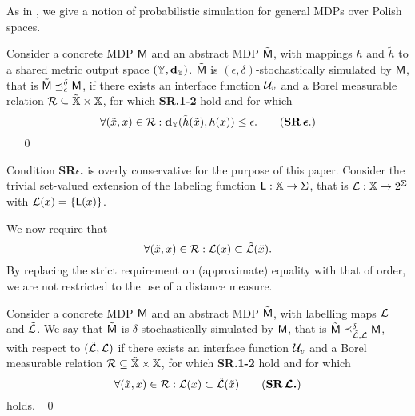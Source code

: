 \documentclass{ifacconf}
\begin{document}
As in \citep{haesaert2017verification},  we give a notion of probabilistic simulation for  general MDPs over Polish spaces.
%
\begin{definition}\label{def:apbsim}
Consider a concrete MDP $\mathsf{M}$ and an abstract  MDP $\tilde{\mathsf{M}}$, with mappings $h$ and  $\tilde h$  to a shared {metric} output space  $({\mathbb{Y}},\mathbf{d}_{\mathbb{Y}})$.   
	$\tilde{\mathsf{M}}$ is $(\epsilon,\delta)$-stochastically simulated by $\mathsf{M}$, that is $\tilde{\mathsf{M}}\preceq^{\delta}_\epsilon\mathsf{M}$,  if there exists an interface function $\mathcal{U}_{v}$ and
	a Borel measurable relation $\mathcal{R}\subseteq \tilde {{\mathbb{X}}}\times {\mathbb{X}}$, for which \textbf{SR.1-2} hold and for which 
	\begin{equation}
		\forall (\tilde x,x)\in \rel:\mathbf{d}_\Y(\tilde h(\tilde x),h(x))  \leq \epsilon.\tag{\textbf{SR\,$\boldsymbol{\epsilon}$}.}
	\end{equation} 
\mbox{ }	\hfill\mbox{ }\qed
\end{definition}
Condition \textbf{SR$\epsilon$.} is overly conservative for the purpose of this paper. 
Consider the trivial set-valued extension of  the labeling function $\mathsf{L}:{\mathbb{X}}\rightarrow\Sigma$, that is  $\mathcal{L}:{\mathbb{X}}\rightarrow2^\Sigma$ with
 $\mathcal{L}(x)=\{\mathsf{L}(x)\}$.
 
We now require that \begin{equation}
  \forall (\tilde x,x )\in \mathcal{R}:  \mathcal{L}(x)\subset \tilde{\mathcal{L}}(\tilde x).
  \end{equation} 
By replacing the strict requirement on (approximate) equality with that of order,   we are not restricted to the use of a distance measure. %
 

\begin{definition}\label{def:apbsim}
Consider a concrete MDP $\mathsf{M}$ and an abstract  MDP $\tilde{\mathsf{M}}$, with labelling maps $\mathcal{L}$ and  $\tilde{\mathcal{L}}$.   
We say that	$\tilde{\mathsf{M}}$ is $\delta$-stochastically simulated by $\mathsf{M}$, that is $\tilde{\mathsf{M}}\preceq^{\delta}_{\tilde{\mathcal{L}},\mathcal{L}}\mathsf{M}$, with respect to $(\tilde{\mathcal{L}},\mathcal{L})$  if there exists an interface function $\mathcal{U}_{v}$ and
	a Borel measurable relation $\mathcal{R}\subseteq \tilde {{\mathbb{X}}}\times {\mathbb{X}}$, for which \textbf{SR.1-2} hold and for which 	\begin{equation}
	  \forall (\tilde x,x)\in \rel:  \Labset(x)\subset \tilde{\Labset}(\tilde x)
\tag{\textbf{SR$\,\boldsymbol{\CA{L}}$.}}
	\end{equation} 
holds. \hfill\mbox{ }\qed
\end{definition}
\end{document}

